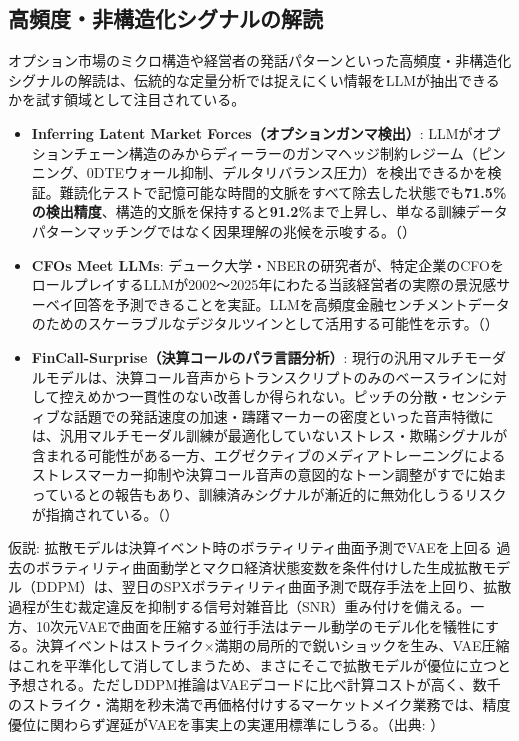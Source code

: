 \subsection{高頻度・非構造化シグナルの解読}

オプション市場のミクロ構造や経営者の発話パターンといった高頻度・非構造化シグナルの解読は、伝統的な定量分析では捉えにくい情報をLLMが抽出できるかを試す領域として注目されている。

\begin{itemize}
  \item \textbf{Inferring Latent Market Forces（オプションガンマ検出）}: LLMがオプションチェーン構造のみからディーラーのガンマヘッジ制約レジーム（ピンニング、0DTEウォール抑制、デルタリバランス圧力）を検出できるかを検証。難読化テストで記憶可能な時間的文脈をすべて除去した状態でも\textbf{71.5\%の検出精度}、構造的文脈を保持すると\textbf{91.2\%}まで上昇し、単なる訓練データパターンマッチングではなく因果理解の兆候を示唆する。（\cite{gammaexposure2025}）
  \item \textbf{CFOs Meet LLMs}: デューク大学・NBERの研究者が、特定企業のCFOをロールプレイするLLMが2002〜2025年にわたる当該経営者の実際の景況感サーベイ回答を予測できることを実証。LLMを高頻度金融センチメントデータのためのスケーラブルなデジタルツインとして活用する可能性を示す。（\cite{cfosmeetllms2026}）
  \item \textbf{FinCall-Surprise（決算コールのパラ言語分析）}: 現行の汎用マルチモーダルモデルは、決算コール音声からトランスクリプトのみのベースラインに対して控えめかつ一貫性のない改善しか得られない。ピッチの分散・センシティブな話題での発話速度の加速・躊躇マーカーの密度といった音声特徴には、汎用マルチモーダル訓練が最適化していないストレス・欺瞞シグナルが含まれる可能性がある一方、エグゼクティブのメディアトレーニングによるストレスマーカー抑制や決算コール音声の意図的なトーン調整がすでに始まっているとの報告もあり、訓練済みシグナルが漸近的に無効化しうるリスクが指摘されている。（\cite{fincallsurprise2025}）
\end{itemize}

\begin{insight}{仮説: 拡散モデルは決算イベント時のボラティリティ曲面予測でVAEを上回る}
過去のボラティリティ曲面動学とマクロ経済状態変数を条件付けした生成拡散モデル（DDPM）は、翌日のSPXボラティリティ曲面予測で既存手法を上回り、拡散過程が生む裁定違反を抑制する信号対雑音比（SNR）重み付けを備える。一方、10次元VAEで曲面を圧縮する並行手法はテール動学のモデル化を犠牲にする。決算イベントはストライク×満期の局所的で鋭いショックを生み、VAE圧縮はこれを平準化して消してしまうため、まさにそこで拡散モデルが優位に立つと予想される。ただしDDPM推論はVAEデコードに比べ計算コストが高く、数千のストライク・満期を秒未満で再価格付けするマーケットメイク業務では、精度優位に関わらず遅延がVAEを事実上の実運用標準にしうる。（出典: \cite{diffusionvol2025}）
\end{insight}

